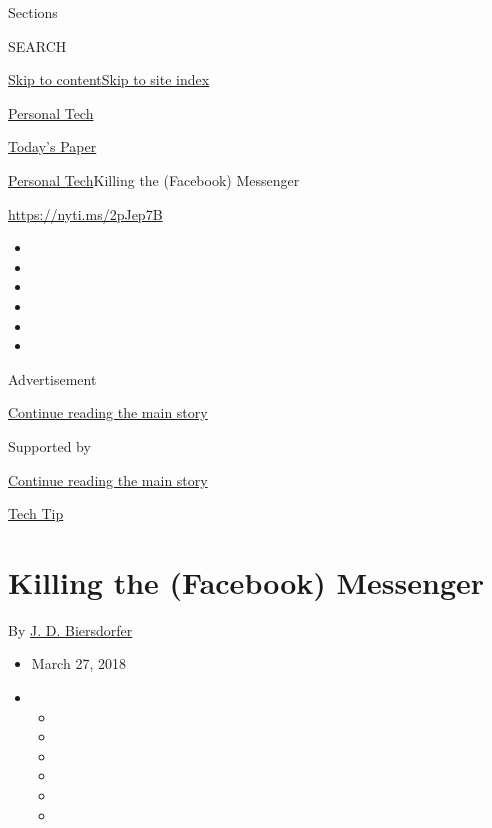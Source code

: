 Sections

SEARCH

\protect\hyperlink{site-content}{Skip to
content}\protect\hyperlink{site-index}{Skip to site index}

\href{https://www.nytimes3xbfgragh.onion/section/technology/personaltech}{Personal
Tech}

\href{https://myaccount.nytimes3xbfgragh.onion/auth/login?response_type=cookie\&client_id=vi}{}

\href{https://www.nytimes3xbfgragh.onion/section/todayspaper}{Today's
Paper}

\href{/section/technology/personaltech}{Personal Tech}\textbar{}Killing
the (Facebook) Messenger

\href{https://nyti.ms/2pJep7B}{https://nyti.ms/2pJep7B}

\begin{itemize}
\item
\item
\item
\item
\item
\item
\end{itemize}

Advertisement

\protect\hyperlink{after-top}{Continue reading the main story}

Supported by

\protect\hyperlink{after-sponsor}{Continue reading the main story}

\href{/column/tech-tip}{Tech Tip}

\hypertarget{killing-the-facebook-messenger}{%
\section{Killing the (Facebook)
Messenger}\label{killing-the-facebook-messenger}}

By \href{http://www.nytimes3xbfgragh.onion/by/j-d-biersdorfer}{J. D.
Biersdorfer}

\begin{itemize}
\item
  March 27, 2018
\item
  \begin{itemize}
  \item
  \item
  \item
  \item
  \item
  \item
  \end{itemize}
\end{itemize}

